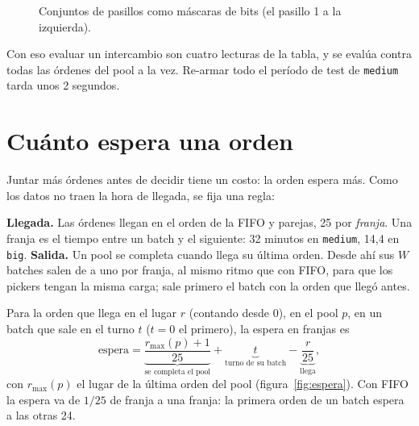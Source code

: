 \documentclass[11pt,a4paper,oneside]{report}
\newcommand{\code}[1]{\texttt{\small #1}}
\newcommand{\RS}{R_S}
\begin{document}
\begin{figure}[ht]
\centering
{}
\caption{Conjuntos de pasillos como máscaras de bits (el pasillo 1 a la izquierda).}
\label{fig:mascaras}
\end{figure}

Con eso evaluar un intercambio son cuatro lecturas de la tabla, y se evalúa contra todas las
órdenes del pool a la vez. Re-armar todo el período de test de \code{medium} tarda unos 2
segundos.

\section{Cuánto espera una orden}
\label{sec:espera}

Juntar más órdenes antes de decidir tiene un costo: la orden espera más. Como los datos no
traen la hora de llegada, se fija una regla:

\begin{supuesto}
\textbf{Llegada.} Las órdenes llegan en el orden de la FIFO y parejas, 25 por \emph{franja}.
Una franja es el tiempo entre un batch y el siguiente: 32 minutos en \code{medium}, 14,4 en
\code{big}. \textbf{Salida.} Un pool se completa cuando llega su última orden. Desde ahí sus
$W$ batches salen de a uno por franja, al mismo ritmo que con FIFO, para que los pickers
tengan la misma carga; sale primero el batch con la orden que llegó antes.
\end{supuesto}

Para la orden que llega en el lugar $r$ (contando desde 0), en el pool $p$, en un batch que sale
en el turno $t$ ($t = 0$ el primero), la espera en franjas es
\[
\text{espera} = \underbrace{\frac{r_{\max}(p) + 1}{25}}_{\text{se completa el pool}}
+ \underbrace{t}_{\text{turno de su batch}} - \underbrace{\frac{r}{25}}_{\text{llega}},
\]
con $r_{\max}(p)$ el lugar de la última orden del pool (figura~\ref{fig:espera}). Con FIFO la
espera va de $1/25$ de franja a una franja: la primera orden de un batch espera a las otras 24.
\end{document}
